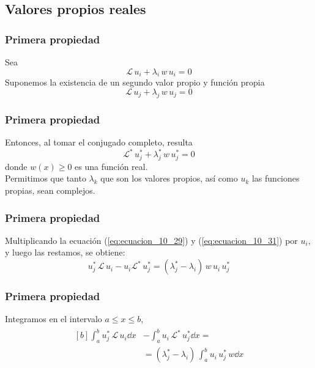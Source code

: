\subsection{Valores propios reales}
\begin{frame}
\frametitle{Primera propiedad}
Sea
\begin{equation}
\mathcal{L} \, u_{i} + \lambda_{i} \, w \, u_{i} = 0
\label{eq:ecuacion_10_29}
\end{equation}
Suponemos la existencia de un segundo valor propio y función propia
\begin{equation}
\mathcal{L} \, u_{j} + \lambda_{j} \, w \, u_{j} = 0
\label{eq:ecuacion_10_30}
\end{equation}
\end{frame}
\begin{frame}
\frametitle{Primera propiedad}
Entonces, al tomar el conjugado completo, resulta
\begin{equation}
\mathcal{L}^{*} \, u_{j}^{*} + \lambda_{j}^{*} \, w \, u_{j}^{*} = 0
\label{eq:ecuacion_10_31}
\end{equation}
donde $w(x) \geq 0$ es una función real.
\\
\bigskip
\pause
Permitimos que tanto $\lambda_{k}$ que son los valores propios, así como $u_{k}$ las funciones propias, sean complejos.
\end{frame}
\begin{frame}
\frametitle{Primera propiedad}
Multiplicando la ecuación (\ref{eq:ecuacion_10_29}) y (\ref{eq:ecuacion_10_31}) por $u_{i}$, y luego las restamos, se obtiene:
\begin{equation}
u_{j}^{*} \, \mathcal{L} \, u_{i} - u_{i} \mathcal{L}^{*} \, u_{j}^{*} =  (\lambda_{j}^{*} - \lambda_{i}) \, w \, u_{i} \, u_{j}^{*}
\label{eq:ecuacion_10_32}
\end{equation}
\end{frame}
\begin{frame}
\frametitle{Primera propiedad}
Integramos en el intervalo $a \leq x \leq b$,
\begin{align}
\begin{aligned}[b]
\int_{a}^{b} u_{j}^{*} \, \mathcal{L} \, u_{i} \dd{x} &- \int_{a}^{b} u_{i} \, \mathcal{L}^{*} \, u_{j}^{*} \dd{x} = \\[1em]
&= (\lambda_{j}^{*} - \lambda_{i}) \, \int_{a}^{b}  u_{i} \, u_{j}^{*} \, w \dd{x}
\end{aligned}
\label{eq:ecuacion_10_33}
\end{align}
\end{frame}
